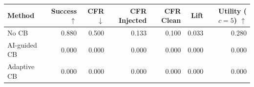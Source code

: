\begin{tabular}{lrrrrrr}
\toprule
Method & Success $\uparrow$ & CFR $\downarrow$ & CFR Injected & CFR Clean & Lift & Utility ($c=5$) $\uparrow$ \\
\midrule
No CB & 0.880 & 0.500 & 0.133 & 0.100 & 0.033 & 0.280 \\
AI-guided CB & 0.000 & 0.000 & 0.000 & 0.000 & 0.000 & 0.000 \\
Adaptive CB & 0.000 & 0.000 & 0.000 & 0.000 & 0.000 & 0.000 \\
\bottomrule
\end{tabular}
